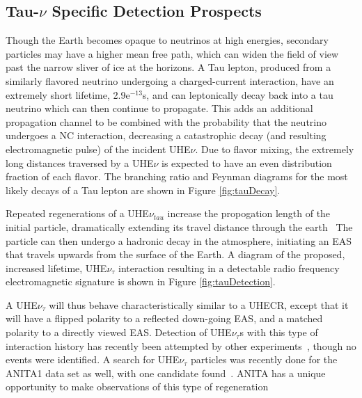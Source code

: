 	\subsection{Tau-$\nu$ Specific Detection Prospects}
		Though the Earth becomes opaque to neutrinos at high energies, secondary particles may have a higher mean free path, which can widen the field of view past the narrow sliver of ice at the horizons.  A Tau lepton, produced from a similarly flavored neutrino undergoing a charged-current interaction, have an extremely short lifetime, 2.9e$^{-13}$s, and can leptonically decay back into a tau neutrino which can then continue to propagate.  This adds an additional propagation channel to be combined with the probability that the neutrino undergoes a NC interaction, decreasing a catastrophic decay (and resulting electromagnetic pulse) of the incident UHE$\nu$. Due to flavor mixing, the extremely long distances traversed by a UHE$\nu$ is expected to have an even distribution fraction of each flavor.  The branching ratio and Feynman diagrams for the most likely decays of a Tau lepton are shown in Figure \ref{fig:tauDecay}.
		
		Repeated regenerations of a UHE$\nu_{tau}$ increase the propogation length of the initial particle, dramatically extending its travel distance through the earth~\cite{TauRegeneration}  The particle can then undergo a hadronic decay in the atmosphere, initiating an EAS that travels upwards from the surface of the Earth.  A diagram of the proposed, increased lifetime, UHE$\nu_{\tau}$ interaction resulting in a detectable radio frequency electromagnetic signature is shown in Figure \ref{fig:tauDetection}.
		
		A UHE$\nu_{\tau}$ will thus behave characteristically similar to a UHECR, except that it will have a flipped polarity to a reflected down-going EAS, and a matched polarity to a directly viewed EAS.  Detection of UHE$\nu_{\tau}$s with this type of interaction history has recently been attempted by other experiments~\cite{AugerTauSearch}, though no events were identified.  A search for UHE$\nu_{\tau}$ particles was recently done for the ANITA1 data set as well, with one candidate found~\cite{PhysRevD.86.022005}.  ANITA has a unique opportunity to make observations of this type of regeneration 

